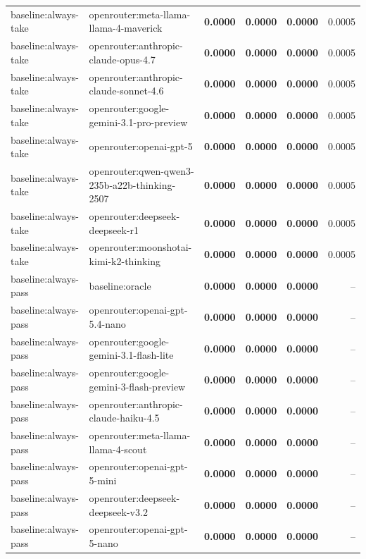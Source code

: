 \begin{table}[t]
\begin{tabular}{llrrrr}
baseline:always-take & openrouter:meta-llama-llama-4-maverick & \textbf{0.0000} & \textbf{0.0000} & \textbf{0.0000} & 0.0005 \\
baseline:always-take & openrouter:anthropic-claude-opus-4.7 & \textbf{0.0000} & \textbf{0.0000} & \textbf{0.0000} & 0.0005 \\
baseline:always-take & openrouter:anthropic-claude-sonnet-4.6 & \textbf{0.0000} & \textbf{0.0000} & \textbf{0.0000} & 0.0005 \\
baseline:always-take & openrouter:google-gemini-3.1-pro-preview & \textbf{0.0000} & \textbf{0.0000} & \textbf{0.0000} & 0.0005 \\
baseline:always-take & openrouter:openai-gpt-5 & \textbf{0.0000} & \textbf{0.0000} & \textbf{0.0000} & 0.0005 \\
baseline:always-take & openrouter:qwen-qwen3-235b-a22b-thinking-2507 & \textbf{0.0000} & \textbf{0.0000} & \textbf{0.0000} & 0.0005 \\
baseline:always-take & openrouter:deepseek-deepseek-r1 & \textbf{0.0000} & \textbf{0.0000} & \textbf{0.0000} & 0.0005 \\
baseline:always-take & openrouter:moonshotai-kimi-k2-thinking & \textbf{0.0000} & \textbf{0.0000} & \textbf{0.0000} & 0.0005 \\
baseline:always-pass & baseline:oracle & \textbf{0.0000} & \textbf{0.0000} & \textbf{0.0000} & -- \\
baseline:always-pass & openrouter:openai-gpt-5.4-nano & \textbf{0.0000} & \textbf{0.0000} & \textbf{0.0000} & -- \\
baseline:always-pass & openrouter:google-gemini-3.1-flash-lite & \textbf{0.0000} & \textbf{0.0000} & \textbf{0.0000} & -- \\
baseline:always-pass & openrouter:google-gemini-3-flash-preview & \textbf{0.0000} & \textbf{0.0000} & \textbf{0.0000} & -- \\
baseline:always-pass & openrouter:anthropic-claude-haiku-4.5 & \textbf{0.0000} & \textbf{0.0000} & \textbf{0.0000} & -- \\
baseline:always-pass & openrouter:meta-llama-llama-4-scout & \textbf{0.0000} & \textbf{0.0000} & \textbf{0.0000} & -- \\
baseline:always-pass & openrouter:openai-gpt-5-mini & \textbf{0.0000} & \textbf{0.0000} & \textbf{0.0000} & -- \\
baseline:always-pass & openrouter:deepseek-deepseek-v3.2 & \textbf{0.0000} & \textbf{0.0000} & \textbf{0.0000} & -- \\
baseline:always-pass & openrouter:openai-gpt-5-nano & \textbf{0.0000} & \textbf{0.0000} & \textbf{0.0000} & -- \\

\end{tabular}
\end{table}
